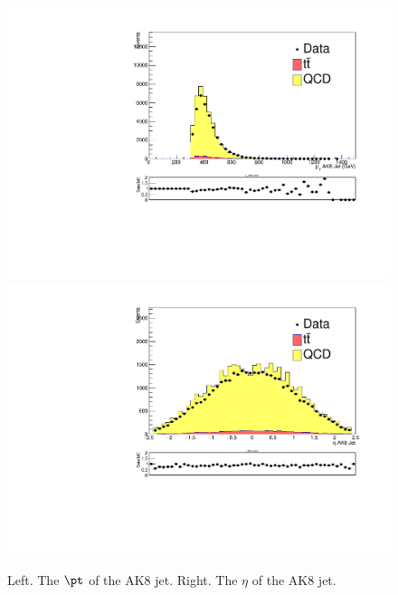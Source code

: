 \begin{figure}[thb!]
\begin{center}
\includegraphics[scale=0.34]{Figures/ratMCptFJ.pdf}
\includegraphics[scale=0.34]{Figures/ratMCetaFJ.pdf}\\
\end{center}
\caption{Left. The $\pt$ of the AK8 jet. Right. The $\eta$ of the AK8 jet.}
\label{fig:dMCAK8pteta}
\end{figure} 


